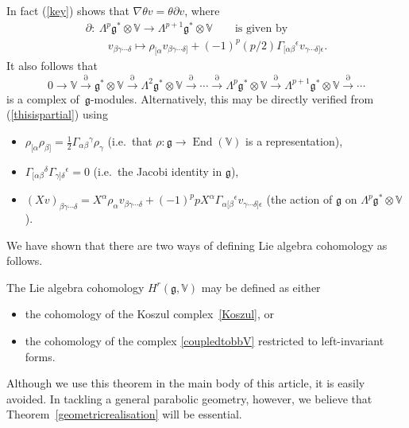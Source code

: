 \documentclass[pdftex]{sigma}
\newcommand{\End}{\operatorname{End}}
\begin{document}
In fact (\ref{key}) shows that $\nabla\theta v=\theta\partial v$, where
\begin{gather}
\partial: \ \Lambda^p{\mathfrak{g}}^*\otimes{\mathbb{V}}\to
\Lambda^{p+1}{\mathfrak{g}}^*\otimes{\mathbb{V}}
\qquad\mbox{is given by}\nonumber\\
\qquad
v_{\beta\gamma\cdots\delta}\mapsto\rho_{[\alpha}v_{\beta\gamma\cdots\delta]}
+(-1)^p(p/2)\Gamma_{[\alpha\beta}{}^\epsilon v_{\gamma\cdots\delta]\epsilon}.\label{thisispartial}
\end{gather}
It also follows that
\begin{equation}\label{Koszul}
0\to{\mathbb{V}}\stackrel{\partial}{\longrightarrow}
{\mathfrak{g}}^*\otimes{\mathbb{V}}\stackrel{\partial}{\longrightarrow}
\Lambda^2{\mathfrak{g}}^*\otimes{\mathbb{V}}
\stackrel{\partial}{\longrightarrow}\cdots\stackrel{\partial}{\longrightarrow}
\Lambda^p{\mathfrak{g}}^*\otimes{\mathbb{V}}
\stackrel{\partial}{\longrightarrow}
\Lambda^{p+1}{\mathfrak{g}}^*\otimes{\mathbb{V}}
\stackrel{\partial}{\longrightarrow}
\cdots\end{equation}
is a complex of~${\mathfrak{g}}$-modules. Alternatively, this may be directly
verif\/ied from (\ref{thisispartial}) using
\begin{itemize}\itemsep=0pt
\item
$\rho_{[\alpha}\rho_{\beta]}=\frac12\Gamma_{\alpha\beta}{}^\gamma\rho_\gamma$
(i.e.~that $\rho:{\mathfrak{g}}\to\End({\mathbb{V}})$ is a representation),
\item $\Gamma_{[\alpha\beta}{}^\delta\Gamma_{\gamma]\delta}{}^\epsilon=0$
(i.e.~the Jacobi identity in ${\mathfrak{g}}$),
\item $(Xv)_{\beta\gamma\cdots\delta}
=X^\alpha\rho_\alpha v_{\beta\gamma\cdots\delta}
+(-1)^ppX^\alpha\Gamma_{\alpha[\beta}{}^\epsilon
v_{\gamma\cdots\delta]\epsilon}$ (the action of ${\mathfrak{g}}$ on
$\Lambda^p{\mathfrak{g}}^*\otimes{\mathbb{V}}$).
\end{itemize}
We have shown that there are two ways of def\/ining Lie algebra cohomology as
follows.
\begin{theorem}\label{geometricrealisation} The Lie algebra cohomology
$H^r({\mathfrak{g}},{\mathbb{V}})$ may be defined as either
\begin{itemize}\itemsep=0pt
\item the cohomology of the Koszul complex~\eqref{Koszul}, or
\item the cohomology of the complex \eqref{coupledtobbV} restricted to
left-invariant forms.
\end{itemize}
\end{theorem}
\begin{remark} Although we use this theorem in the main body of this article,
it is easily avoided. In tackling a general parabolic geometry,
however, we believe that Theorem~\ref{geometricrealisation} will be essential.
\end{remark}
\end{document}
